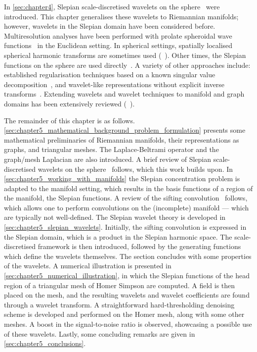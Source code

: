 In \cref{sec:chapter4}, Slepian scale-discretised wavelets on the sphere~\cite{Roddy2022} were introduced.
This chapter generalises these wavelets to Riemannian manifolds; however, wavelets in the Slepian domain have been considered before.
Multiresolution analyses have been performed with prolate spheroidal wave functions~\cite{Walter2004} in the Euclidean setting.
In spherical settings, spatially localised spherical harmonic transforms are sometimes used (\eg{}~\cite{Simons1997,Wieczorek2005,Khalid2013,Khalid2013a}).
Other times, the Slepian functions on the sphere are used directly~\cite{Simons2009}.
A variety of other approaches include: established regularisation techniques based on a known singular value decomposition~\cite{Michel2017}, and wavelet-like representations without explicit inverse transforms~\cite{Simons2011}.
Extending wavelets and wavelet techniques to manifold and graph domains has been extensively reviewed (\eg{}~\cite{Dahmen1999,Coifman2006a}).

The remainder of this chapter is as follows.
\cref{sec:chapter5_mathematical_background_problem_formulation} presents some mathematical preliminaries of Riemannian manifolds, their representations as graphs, and triangular meshes.
The Laplace-Beltrami operator and the graph/mesh Laplacian are also introduced.
A brief review of Slepian scale-discretised wavelets on the sphere~\cite{Roddy2022} follows, which this work builds upon.
In \cref{sec:chapter5_working_with_manifolds} the Slepian concentration problem is adapted to the manifold setting, which results in the basis functions of a region of the manifold, \ie{} the Slepian functions.
A review of the sifting convolution~\cite{Roddy2021} follows, which allows one to perform convolutions on the (incomplete) manifold --- which are typically not well-defined.
The Slepian wavelet theory is developed in \cref{sec:chapter5_slepian_wavelets}.
Initially, the sifting convolution is expressed in the Slepian domain, which is a product in the Slepian harmonic space.
The scale-discretised framework is then introduced, followed by the generating functions which define the wavelets themselves.
The section concludes with some properties of the wavelets.
A numerical illustration is presented in \cref{sec:chapter5_numerical_illustration}, in which the Slepian functions of the head region of a triangular mesh of Homer Simpson are computed.
A field is then placed on the mesh, and the resulting wavelets and wavelet coefficients are found through a wavelet transform.
A straightforward hard-thresholding denoising scheme is developed and performed on the Homer mesh, along with some other meshes.
A boost in the signal-to-noise ratio is observed, showcasing a possible use of these wavelets.
Lastly, some concluding remarks are given in \cref{sec:chapter5_conclusions}.

